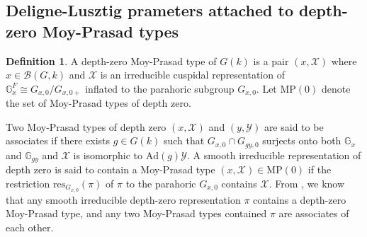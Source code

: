 \documentclass[11 pt]{article}
\numberwithin{equation}{subsection}
\theoremstyle{definition}
\newtheorem{definition}[theorem]{Definition}
\theoremstyle{remark}
\theoremstyle{conjecture}
\newcommand{\res}{\mathrm{res}}
\newcommand{\Ad}{\mathrm{Ad}}
\newcommand{\MP}{\mathrm{MP}}
\newcommand{\G}{\mathbb G}
\newcommand{\B}{\mathcal{B}}
\newcommand{\mc}{\mathcal}
\begin{document}
\subsection{Deligne-Lusztig prameters attached to depth-zero Moy-Prasad types}
\begin{definition}
    A depth-zero Moy-Prasad type of $G(k)$ is a pair $(x,\mc X)$ where $x \in \B(G,k)$ and $\mc X$ is an irreducible cuspidal representation of $\G_x^F\cong G_{x,0}/G_{x,0+}$ inflated to the parahoric subgroup $G_{x,0}$. Let $\mathrm{MP}(0)$ denote the set of Moy-Prasad types of depth zero. 
\end{definition}
Two Moy-Prasad types of depth zero $(x,\mc X)$ and $(y,\mc Y)$ are said to be associates if there exists $g \in G(k)$ such that $G_{x,0}\cap G_{gy,0}$ surjects onto both $\G_x$ and $\G_{gy}$ and $\mc X$ is isomorphic to $\Ad(g)\mc Y$. A smooth irreducible representation of depth zero is said to contain a Moy-Prasad type $(x,\mc X)\in \MP(0)$ if the restriction $\res_{G_{x,0}}(\pi) $ of $\pi $
to the parahoric $G_{x,0}$ contains $\mc X$. From \cite[Theorem 5.2]{MP94}, we know that any smooth irreducible depth-zero representation $\pi$ contains a depth-zero Moy-Prasad type, and any two Moy-Prasad types contained $\pi$ are associates of each other. \paragraph{}
\end{document}
